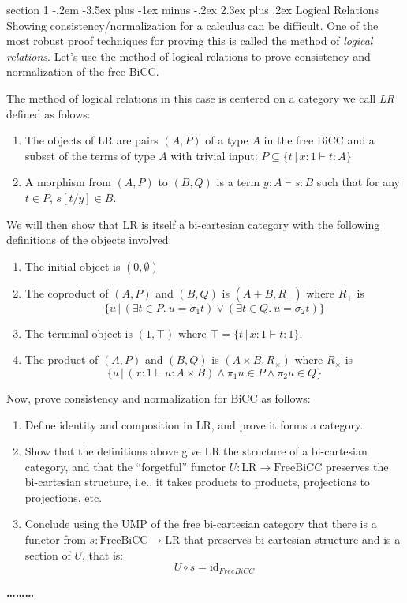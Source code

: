 \documentclass[12pt]{article}
\makeatletter
\newenvironment{problem}{\@startsection
       {section}
       {1}
       {-.2em}
       {-3.5ex plus -1ex minus -.2ex}
       {2.3ex plus .2ex}
       {\pagebreak[3]%
       \large\bf\noindent{Problem }
       }
       }
       {%
       \begin{center}\large\bf \ldots\ldots\ldots\end{center}}
\makeatother
\begin{document}
\begin{problem}{Logical Relations}
  Showing consistency/normalization for a calculus can be
  difficult. One of the most robust proof techniques for proving this
  is called the method of \emph{logical relations}. Let's use the
  method of logical relations to prove consistency and normalization
  of the free BiCC.

  The method of logical relations in this case is centered on a
  category we call \emph{LR} defined as folows:
  \begin{enumerate}
  \item The objects of LR are pairs $(A, P)$ of a type $A$ in the free
    BiCC and a subset of the terms of type $A$ with trivial input: $P
    \subseteq \{ t \,|\, x:1 \vdash t : A \}$
  \item A morphism from $(A, P)$ to $(B, Q)$ is a term $y : A \vdash s
    : B$ such that for any $t \in P$, $s[t/y] \in B$.
  \end{enumerate}

  We will then show that LR is itself a bi-cartesian category with the
  following definitions of the objects involved:
  \begin{enumerate}
  \item The initial object is $(0, \emptyset)$
  \item The coproduct of $(A, P)$ and $(B, Q)$ is $(A + B, R_+)$ where $R_+$ is
    \[ \{ u \,|\, (\exists t \in P.~ u = \sigma_1 t) \vee (\exists t \in Q.~ u = \sigma_2 t) \} \]
  \item The terminal object is $(1, \top)$ where $\top = \{ t \,|\,
    x:1 \vdash t : 1 \}$.
  \item The product of $(A, P)$ and $(B, Q)$ is $(A \times B, R_\times)$ where $R_\times$ is
    \[ \{ u \,|\, (x : 1 \vdash u : A \times B) \wedge \pi_1 u \in P \wedge \pi_2 u \in Q \} \]
  \end{enumerate}

  Now, prove consistency and normalization for BiCC as follows:
  \begin{enumerate}
  \item Define identity and composition in LR, and prove it forms a
    category.
  \item Show that the definitions above give LR the structure of a
    bi-cartesian category, and that the ``forgetful'' functor $U :
    \textrm{LR} \to \textrm{FreeBiCC}$ preserves the bi-cartesian
    structure, i.e., it takes products to products, projections to
    projections, etc.
  \item Conclude using the UMP of the free bi-cartesian category that
    there is a functor from $s : \textrm{FreeBiCC} \to \textrm{LR}$
    that preserves bi-cartesian structure and is a section of $U$,
    that is:
    \[U \circ s = \textrm{id}_{FreeBiCC}\]


\end{enumerate}
\end{problem}
\end{document}
